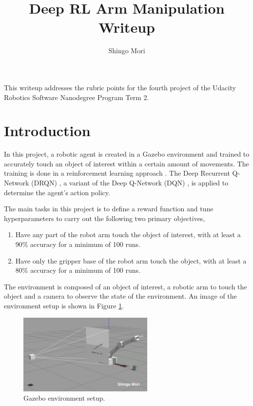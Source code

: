 \documentclass[a4paper]{article}
\title{Deep RL Arm Manipulation Writeup}
\author{Shingo Mori}
\begin{document}
\maketitle

This writeup addresses the rubric points for the fourth project of the Udacity Robotics Software Nanodegree Program Term 2.

\section{Introduction}
In this project, a robotic agent is created in a Gazebo environment and trained to accurately touch an object of interest within a certain amount of movements. The training is done in a reinforcement learning approach \cite{Sutton:1998:IRL:551283}. The Deep Recurrent Q-Network (DRQN) \cite{Hausknecht2015}, a variant of the Deep Q-Network (DQN) \cite{Zhan2016}, is applied to determine the agent's action policy.

The main tasks in this project is to define a reward function and tune hyperparameters to carry out the following two primary objectives,

\begin{enumerate}
    \item Have any part of the robot arm touch the object of interest, with at least a 90\% accuracy for a minimum of 100 runs.
    \item Have only the gripper base of the robot arm touch the object, with at least a 80\% accuracy for a minimum of 100 runs.
\end{enumerate}

The environment is composed of an object of interest, a robotic arm to touch the object and a camera to observe the state of the environment. An image of the environment setup is shown in Figure \ref{fig:environment}.

\begin{figure}[ht]
\centering
\includegraphics[width=0.6\textwidth]{environment}
\caption{Gazebo environment setup. }
\label{fig:environment}
\end{figure}
\end{document}
